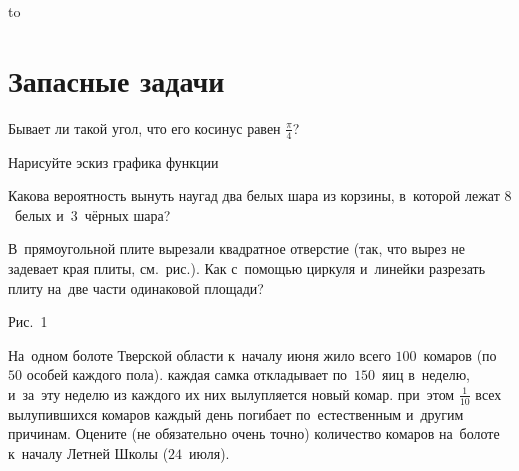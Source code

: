 \documentclass[draft]{article}
\begin{document}
\hbox to

\newpage

\section{Запасные задачи}

\begin{problem}
Бывает ли такой угол, что его косинус равен $\frac{\pi}{4}$?
\end{problem}

\begin{problem}[Народная]
Нарисуйте эскиз графика функции
\end{problem}

\begin{problem}[Юра Ц.]
Какова вероятность вынуть наугад два белых шара из корзины, в~которой лежат
$8$~белых и~$3$~чёрных шара?
\end{problem}

\begin{problem}[Народная]
В~прямоугольной плите вырезали квадратное отверстие (так, что вырез не задевает
края плиты, см.~рис.). Как с~помощью циркуля и~линейки разрезать плиту
на~две части одинаковой площади?

\centerline{}
\centerline{\normalfont\footnotesize Рис.~1}
\end{problem}

\begin{problem}
На~одном болоте Тверской области к~началу июня жило всего $100$~комаров
(по~$50$ особей каждого пола).
каждая самка откладывает по~$150$~яиц в~неделю, и~за~эту неделю из каждого
их них вылупляется новый комар.
при~этом $\frac1{10}$ всех вылупившихся комаров каждый день погибает по~естественным
и~другим причинам. Оцените (не обязательно очень точно) количество комаров на~болоте
к~началу Летней Школы ($24$~июля).
\end{problem}
\end{document}
